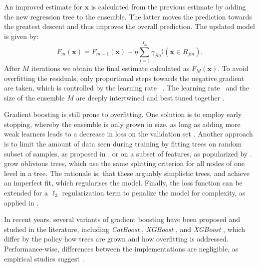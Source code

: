 An improved estimate for $\mathbf{x}$ is calculated from the previous estimate by adding the new regression tree to the ensemble. The latter moves the prediction towards the greatest descent and thus improves the overall prediction. The updated model is given by:
\begin{equation}
    F_{m}(\mathbf{x})=F_{m-1}(\mathbf{x})+\eta \sum_{j=1}^{J_{m}} \gamma_{j m} \mathbb{I}\left(\mathbf{x} \in R_{j m}\right).
\end{equation}
After $M$ iterations we obtain the final estimate calculated as $F_{M}\left(\mathbf{x}\right)$. To avoid \gls{overfitting} the residuals, only proportional steps towards the negative gradient are taken, which is controlled by the learning rate \eta~\autocite[][13]{friedmanGreedyFunctionApproximation2001}. The learning rate \eta~and the size of the ensemble $M$ are deeply intertwined and best tuned together \autocite[][13]{friedmanGreedyFunctionApproximation2001}.

Gradient boosting is still prone to \gls{overfitting}. One solution is to employ early stopping, whereby the ensemble is only grown in size, as long as adding more weak learners leads to a decrease in loss on the validation set \autocite[][384]{hastietrevorElementsStatisticalLearning2009}. Another approach is to limit the amount of data seen during training by fitting trees on random subset of samples, as proposed in \textcite[][3]{friedmanStochasticGradientBoosting2002}, or on a subset of features, as popularized by \textcite[][3]{chenXGBoostScalableTree2016}. \textcite[][6]{prokhorenkovaCatBoostUnbiasedBoosting2018} grow oblivious trees, which use the same splitting criterion for all nodes of one level in a tree. The rationale is, that these arguably simplistic trees, and achieve an imperfect fit, which regularises the model. Finally, the loss function can be extended for a $\ell_2$ regularization term to penalize the model for complexity, as applied in \textcite[][2]{chenXGBoostScalableTree2016}.

In recent years, several variants of gradient boosting have been proposed and studied in the literature, including \emph{CatBoost} \autocite[][1--23]{prokhorenkovaCatBoostUnbiasedBoosting2018}, \emph{XGBoost} \autocite[][1--13]{chenXGBoostScalableTree2016}, and \emph{XGBoost} \autocite[][1--13]{chenXGBoostScalableTree2016}, which differ by the policy how trees are grown and how \gls{overfitting} is addressed. Performance-wise, differences between the implementations are negligible, as empirical studies suggest \autocites[][8]{grinsztajnWhyTreebasedModels2022}[][19--20]{gorishniyRevisitingDeepLearning2021}[][7]{somepalliSaintImprovedNeural2021}[][14]{borisovDeepNeuralNetworks2022}.

